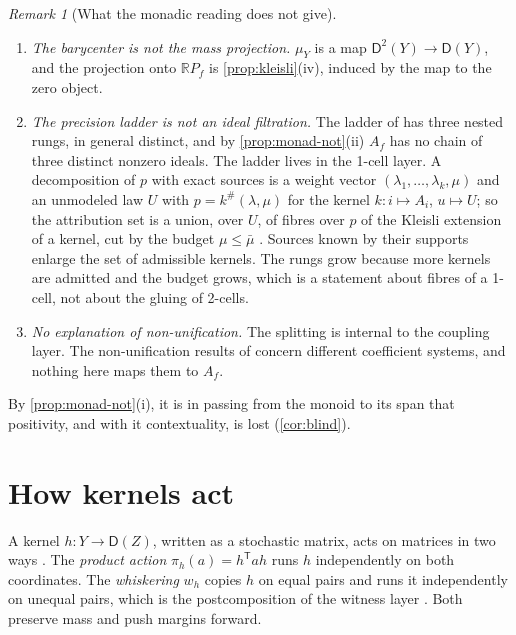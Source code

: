 \documentclass[11pt]{article}
\theoremstyle{definition}
\theoremstyle{remark}
\newtheorem{remark}[theorem]{Remark}
\newcommand{\D}{\mathsf{D}}
\newcommand{\R}{\mathbb{R}}
\newcommand{\T}{\mathsf T}
\begin{document}
\begin{remark}[What the monadic reading does not give]\label{rem:monad-not}
\begin{enumerate}[label=(\alph*),leftmargin=*]
\item \emph{The barycenter is not the mass projection.} $\mu_Y$ is a map $\D^2(Y)\to\D(Y)$, and the projection onto $\R P_f$ is
  \cref{prop:kleisli}(iv), induced by the map to the zero object.
\item \emph{The precision ladder is not an ideal filtration.} The ladder of \cite[Thm.~3.5]{Attribution} has three nested rungs,
  in general distinct, and by \cref{prop:monad-not}(ii) $A_f$ has no chain of three distinct nonzero ideals. The ladder lives in the 1-cell layer. A decomposition
  of $p$ with exact sources is a weight vector $(\lambda_1,\dots,\lambda_k,\mu)$ and an unmodeled law $U$ with
  $p=k^\#(\lambda,\mu)$ for the kernel $k\colon i\mapsto A_i$, $u\mapsto U$; so the attribution set is a union, over $U$, of fibres over
  $p$ of the Kleisli extension of a kernel, cut by the budget $\mu\le\bar\mu$ \cite[Def.~3.1, Thm.~3.2]{Attribution}. Sources known
  by their supports enlarge the set of admissible kernels. The rungs grow because more kernels are admitted and the budget
  grows, which is a statement about fibres of a 1-cell, not about the gluing of 2-cells.
\item \emph{No explanation of non-unification.} The splitting is internal to the coupling layer. The non-unification results of
  \cite{ThreeLayers} concern different coefficient systems, and nothing here maps them to $A_f$.
\end{enumerate}
By \cref{prop:monad-not}(i), it is in passing from the monoid to its span that positivity, and with it contextuality, is lost
(\cref{cor:blind}).
\end{remark}

\section{How kernels act}\label{sec:actions}

A kernel $h\colon Y\to\D(Z)$, written as a stochastic matrix, acts on matrices in two ways \cite[Def.~10.1]{Conditionals}.
The \emph{product action} $\pi_h(a)=h^\T ah$ runs $h$ independently on both coordinates. The \emph{whiskering} $w_h$ copies
$h$ on equal pairs and runs it independently on unequal pairs, which is the postcomposition of the witness layer
\cite[Thm.~7.6]{Attribution}. Both preserve mass and push margins forward.
\end{document}
